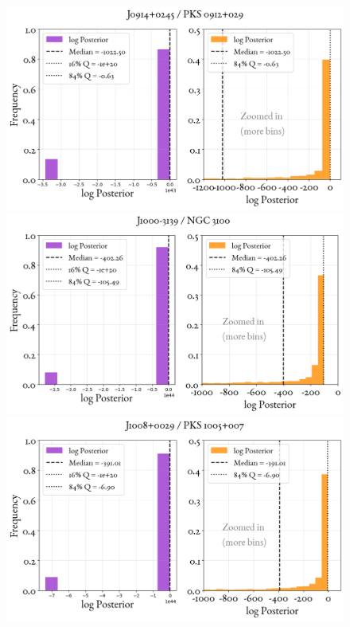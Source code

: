 \begin{figure}
    \centering
    \includegraphics[width=0.8\linewidth]{figures/ResultPosteriors/30_Posterior_2108.png}\\
     \includegraphics[width=0.8\linewidth]{figures/ResultPosteriors/35_Posterior_3076.png}\\
      \includegraphics[width=0.8\linewidth]{figures/ResultPosteriors/36_Posterior_3652.png}  
\end{figure}

